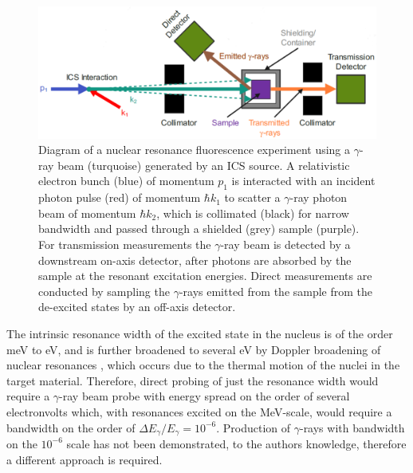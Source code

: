 \documentclass[../main.tex]{subfiles}
\begin{document}
\begin{figure}[!h]
\centering
\includegraphics[width=\textwidth]{Figures/DIANA_Inverse_Compton_Source_Design/NRF_diagram_fixed.pdf}
\caption{Diagram of a nuclear resonance fluorescence experiment using a $\gamma$-ray beam (turquoise) generated by an ICS source. A relativistic electron bunch (blue) of momentum $p_{1}$ is interacted with an incident photon pulse (red) of momentum $\hbar k_{1}$ to scatter a $\gamma$-ray photon beam of momentum $\hbar k_{2}$, which is collimated (black) for narrow bandwidth and passed through a shielded (grey) sample (purple).  For transmission measurements the $\gamma$-ray beam is detected by a downstream on-axis detector, after photons are absorbed by the sample at the resonant excitation energies. Direct measurements are conducted by sampling the $\gamma$-rays emitted from the sample from the de-excited states by an off-axis detector.}
\label{fig:NRF_diagram}
\end{figure}

The intrinsic resonance width of the excited state in the nucleus is of the order \si{\milli\electronvolt} to \si{\electronvolt}, and is further broadened to several \si{\electronvolt} by Doppler broadening of nuclear resonances \cite{angell2015demonstration}, which occurs due to the thermal motion of the nuclei in the target material. Therefore, direct probing of just the resonance width would require a $\gamma$-ray beam probe with energy spread on the order of several electronvolts which, with resonances excited on the \si{\mega\electronvolt}-scale, would require a bandwidth on the order of $\Delta E_{\gamma}/E_{\gamma} = 10^{-6}$. Production of $\gamma$-rays with bandwidth on the $10^{-6}$ scale has not been demonstrated, to the authors knowledge, therefore a different approach is required.
\end{document}
